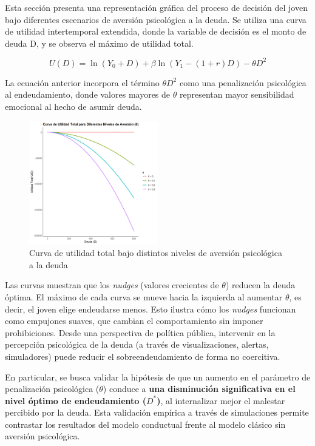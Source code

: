 \documentclass[10pt]{article}
\begin{document}
\begin{multicols}{2}
Esta sección presenta una representación gráfica del proceso de decisión del joven bajo diferentes escenarios de aversión psicológica a la deuda. Se utiliza una curva de utilidad intertemporal extendida, donde la variable de decisión es el monto de deuda D, y se observa el máximo de utilidad total.

\begin{equation}
U(D) = \ln(Y_0 + D) + \beta \ln(Y_1 - (1 + r)D) - \theta D^2
\end{equation}

\noindent La ecuación anterior incorpora el término \(\theta D^2\) como una penalización psicológica al endeudamiento, donde valores mayores de \(\theta\) representan mayor sensibilidad emocional al hecho de asumir deuda.

\begin{figure}[H]
    \centering
    \includegraphics[width=0.5\textwidth]{Utilidad_total.png}
    \caption{Curva de utilidad total bajo distintos niveles de aversión psicológica a la deuda}
    \label{fig:curva-utilidad-total}
\end{figure}

\noindent
Las curvas muestran que los \textit{nudges} (valores crecientes de \(\theta\)) reducen la deuda óptima. El máximo de cada curva se mueve hacia la izquierda al aumentar \(\theta\), es decir, el joven elige endeudarse menos. Esto ilustra cómo los \textit{nudges} funcionan como empujones suaves, que cambian el comportamiento sin imponer prohibiciones. Desde una perspectiva de política pública, intervenir en la percepción psicológica de la deuda (a través de visualizaciones, alertas, simuladores) puede reducir el sobreendeudamiento de forma no coercitiva.

\vspace{1em}

\noindent
En particular, se busca validar la hipótesis de que un aumento en el parámetro de penalización psicológica (\(\theta\)) conduce a \textbf{una disminución significativa en el nivel óptimo de endeudamiento (\(D^*\))}, al internalizar mejor el malestar percibido por la deuda. Esta validación empírica a través de simulaciones permite contrastar los resultados del modelo conductual frente al modelo clásico sin aversión psicológica.



\end{multicols}
\end{document}
